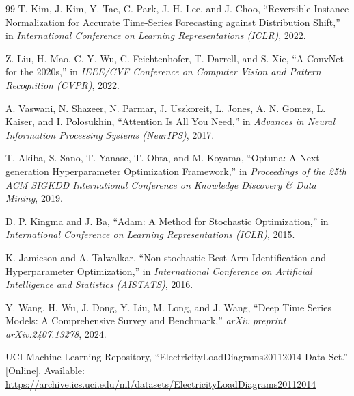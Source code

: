 \documentclass[10pt,journal]{IEEEtran}
\begin{document}
\begin{thebibliography}{99}
T. Kim, J. Kim, Y. Tae, C. Park, J.-H. Lee, and J. Choo, ``Reversible Instance Normalization for Accurate Time-Series Forecasting against Distribution Shift,'' in \emph{International Conference on Learning Representations (ICLR)}, 2022.

Z. Liu, H. Mao, C.-Y. Wu, C. Feichtenhofer, T. Darrell, and S. Xie, ``A ConvNet for the 2020s,'' in \emph{IEEE/CVF Conference on Computer Vision and Pattern Recognition (CVPR)}, 2022.

A. Vaswani, N. Shazeer, N. Parmar, J. Uszkoreit, L. Jones, A. N. Gomez, L. Kaiser, and I. Polosukhin, ``Attention Is All You Need,'' in \emph{Advances in Neural Information Processing Systems (NeurIPS)}, 2017.

T. Akiba, S. Sano, T. Yanase, T. Ohta, and M. Koyama, ``Optuna: A Next-generation Hyperparameter Optimization Framework,'' in \emph{Proceedings of the 25th ACM SIGKDD International Conference on Knowledge Discovery \& Data Mining}, 2019.

D. P. Kingma and J. Ba, ``Adam: A Method for Stochastic Optimization,'' in \emph{International Conference on Learning Representations (ICLR)}, 2015.

K. Jamieson and A. Talwalkar, ``Non-stochastic Best Arm Identification and Hyperparameter Optimization,'' in \emph{International Conference on Artificial Intelligence and Statistics (AISTATS)}, 2016.

Y. Wang, H. Wu, J. Dong, Y. Liu, M. Long, and J. Wang, ``Deep Time Series Models: A Comprehensive Survey and Benchmark,'' \emph{arXiv preprint arXiv:2407.13278}, 2024.

UCI Machine Learning Repository, ``ElectricityLoadDiagrams20112014 Data Set.'' [Online]. Available: \url{https://archive.ics.uci.edu/ml/datasets/ElectricityLoadDiagrams20112014}

\end{thebibliography}
\end{document}
